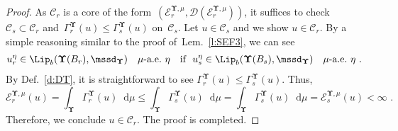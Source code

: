 \documentclass[11pt,letterpaper]{amsart}
\newcommand{\dom}[1]{\mathcal D(#1)}
\newcommand{\diff}{\mathop{}\!\mathrm{d}}
\newcommand{\fstop}{\,\,\mathrm{.}}
\newcommand{\cdc}{\Gamma}
\newcommand{\purple}[1]{{\color{purple}#1}}
\newcommand{\QP}{{\mu}}
\newcommand{\dUpsilon}{{\mathbf \Upsilon}}
\newcommand{\U}{\dUpsilon}
\newcommand{\E}{\mathcal E}
\renewcommand{\1}{\mathbf 1}
\numberwithin{equation}{section}
\theoremstyle{plain}
\theoremstyle{definition}
\theoremstyle{remark}
\begin{document}
\begin{proof}
As $\mathcal C_r$ is a core of the form~$(\E^{\U, \QP}_r, \dom{\E^{\U, \QP}_r})$, it suffices to check~$\mathcal C_s \subset \mathcal C_r$ and~$\cdc^\U_r(u) \le \cdc^\U_s(u)$ on~$\mathcal C_s$. Let $u \in \mathcal C_s$ and we show $u \in \mathcal C_r$.  
 By a simple reasoning similar to the proof of~Lem.~\ref{l:SEF3}, we can see %
\begin{align*}%
 u_r^\eta \in \Lip_b(\U(B_r), \mssd_\U) \quad \text{$\QP$-a.e.~$\eta$ \ \ if} \ \    u_s^\eta \in \Lip_b(\U(B_s), \mssd_\U) \quad \text{$\QP$-a.e.~$\eta$} \fstop
\end{align*} 
By Def.~\ref{d:DT}, it is straightforward to see $\cdc^\U_r(u) \le \cdc^\U_s(u)$. Thus, 
$$\E^{\U, \QP}_{r}(u) =\int_{\U}\cdc^\U_r(u) \diff \mu \le \int_{\U}\cdc^\U_s(u) \diff \mu=\int_{\U}\cdc^\U_s(u) \diff \mu =\E^{\U, \QP}_s(u) <\infty \fstop$$
Therefore, we conclude $u \in \mathcal C_r$.
The proof is completed. 
\end{proof}
\end{document}
